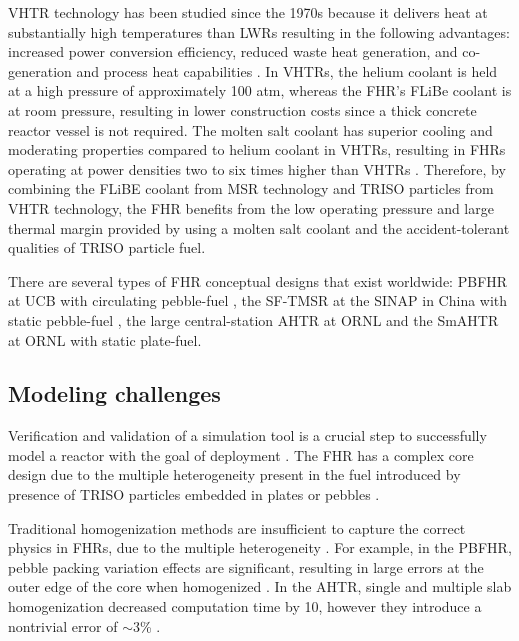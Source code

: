 \gls{VHTR} technology has been studied since the 1970s because it delivers 
heat at substantially high temperatures than \glspl{LWR} resulting in 
the following advantages: increased power conversion efficiency, reduced 
waste heat generation, and co-generation and process heat capabilities 
\cite{scarlat_design_2014}. 
In \glspl{VHTR}, the helium coolant is held at a high pressure of approximately 
100 atm, whereas the \gls{FHR}'s FLiBe coolant is at room pressure, resulting in lower 
construction costs since a thick concrete reactor vessel is not required.
The molten salt coolant has superior cooling and moderating properties compared 
to helium coolant in \glspl{VHTR}, resulting in \glspl{FHR} operating at 
power densities two to six times higher than  \glspl{VHTR} 
\cite{scarlat_design_2014,forsberg_fluoride-salt-cooled_2012}.
Therefore, by combining the FLiBE coolant from \gls{MSR} technology and 
\gls{TRISO} particles from \gls{VHTR} technology, the \gls{FHR} benefits from 
the low operating pressure and large thermal margin provided by using a molten 
salt coolant and the accident-tolerant qualities of \gls{TRISO} particle fuel. 

There are several types of \gls{FHR} conceptual designs that exist
worldwide: \gls{PBFHR} at UCB with circulating pebble-fuel 
\cite{scarlat_current_2014,krumwiede_three-dimensional_2013}, the \gls{SF-TMSR} 
at the \gls{SINAP} in China with static pebble-fuel \cite{liu_preliminary_2016}, 
the large central-station \gls{AHTR} at \gls{ORNL} \cite{holcomb_core_2011, varma_ahtr_2012} and 
the \gls{SmAHTR} at ORNL \cite{greene_pre-conceptual_2010} with static plate-fuel. 

\subsection{Modeling challenges}
Verification and validation of a simulation tool is a crucial step to successfully 
model a reactor with the goal of deployment \cite{rahnema_phenomena_2019}. 
The \gls{FHR} has a complex core design due to the multiple heterogeneity present 
in the fuel introduced by presence of \gls{TRISO} particles embedded in plates or 
pebbles \cite{ramey_monte_2018,rahnema_phenomena_2019}.

Traditional homogenization methods are insufficient to capture the correct physics 
in \glspl{FHR}, due to the multiple heterogeneity \cite{ramey_monte_2018}. 
For example, in the \gls{PBFHR}, pebble packing variation effects are significant, 
resulting in large errors at the outer edge of the core when homogenized 
\cite{rahnema_phenomena_2019}. 
In the \gls{AHTR}, single and multiple slab homogenization decreased computation time 
by 10, however they introduce a nontrivial error of $\sim$3\%
\cite{ramey_monte_2018,cisneros_neutronics_2012}.

